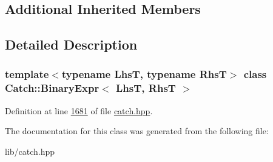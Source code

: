 \subsection*{Additional Inherited Members}


\subsection{Detailed Description}
\subsubsection*{template$<$typename LhsT, typename RhsT$>$\newline
class Catch\+::\+Binary\+Expr$<$ Lhs\+T, Rhs\+T $>$}



Definition at line \mbox{\hyperlink{catch_8hpp_source_l01681}{1681}} of file \mbox{\hyperlink{catch_8hpp_source}{catch.\+hpp}}.



The documentation for this class was generated from the following file\+:\begin{DoxyCompactItemize}
\item 
lib/catch.\+hpp\end{DoxyCompactItemize}

